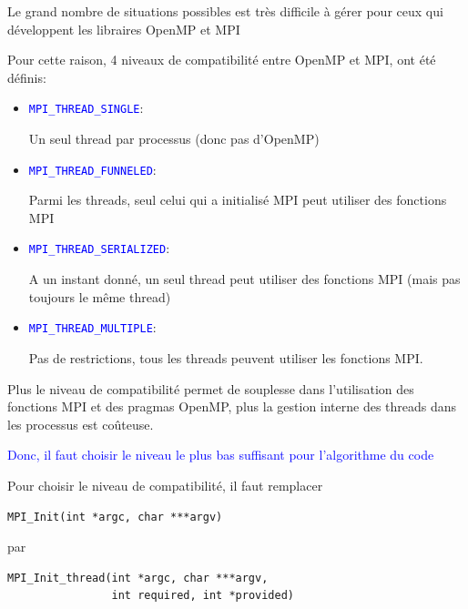 \documentclass{beamer}
\begin{document}
\begin{frame}
\vfill
Le grand nombre de situations possibles est très difficile à gérer pour ceux qui développent les libraires OpenMP et MPI

	\vfill
Pour cette raison, 4 niveaux de compatibilité entre OpenMP et MPI, ont été définis:
	\vfill

\begin{itemize}
	\item {\tt\textcolor{blue}{MPI\_THREAD\_SINGLE}}:
	
	Un seul thread par processus (donc pas d'OpenMP)
	\item {\tt\textcolor{blue}{MPI\_THREAD\_FUNNELED}}:
	
	Parmi les threads, seul celui qui a initialisé MPI peut utiliser des fonctions MPI
	\item {\tt\textcolor{blue}{MPI\_THREAD\_SERIALIZED}}:
	
	A un instant donné, un seul thread peut utiliser des fonctions MPI (mais pas toujours le même thread)
	\item {\tt\textcolor{blue}{MPI\_THREAD\_MULTIPLE}}:
	
	Pas de restrictions, tous les threads peuvent utiliser les fonctions MPI.
	
\end{itemize}

\vfill

\end{frame}

\begin{frame}[fragile]
Plus le niveau de compatibilité permet de souplesse dans l'utilisation des fonctions MPI et des pragmas OpenMP, plus la gestion interne des threads dans les processus est coûteuse.

\textcolor{blue}{Donc, il faut choisir le niveau le plus bas suffisant pour l'algorithme du code}

\vfill
Pour choisir le niveau de compatibilité, il faut remplacer
\begin{lstlisting}
MPI_Init(int *argc, char ***argv)
\end{lstlisting}

par
\begin{lstlisting}
MPI_Init_thread(int *argc, char ***argv,
                int required, int *provided)
\end{lstlisting}

\end{frame}
\end{document}
